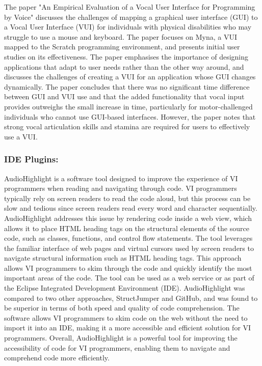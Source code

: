 \documentclass{l4proj}
\begin{document}
The paper "An Empirical Evaluation of a Vocal User Interface for Programming by Voice" \cite{Myna} discusses the challenges of mapping a graphical user interface (GUI) to a Vocal User Interface (VUI) for individuals with physical disabilities who may struggle to use a mouse and keyboard. The paper focuses on Myna, a VUI mapped to the Scratch programming environment, and presents initial user studies on its effectiveness. The paper emphasises the importance of designing applications that adapt to user needs rather than the other way around, and discusses the challenges of creating a VUI for an application whose GUI changes dynamically. The paper concludes that there was no significant time difference between GUI and VUI use and that the added functionality that vocal input provides outweighs the small increase in time, particularly for motor-challenged individuals who cannot use GUI-based interfaces. However, the paper notes that strong vocal articulation skills and stamina are required for users to effectively use a VUI.

\subsubsection{IDE Plugins:}

AudioHighlight \cite{audiohighlight_2018} is a software tool designed to improve the experience of VI programmers when reading and navigating through code. VI programmers typically rely on screen readers to read the code aloud, but this process can be slow and tedious since screen readers read every word and character sequentially. AudioHighlight addresses this issue by rendering code inside a web view, which allows it to place HTML heading tags on the structural elements of the source code, such as classes, functions, and control flow statements.
The tool leverages the familiar interface of web pages and virtual cursors used by screen readers to navigate structural information such as HTML heading tags. This approach allows VI programmers to skim through the code and quickly identify the most important areas of the code. The tool can be used as a web service or as part of the Eclipse Integrated Development Environment (IDE).
AudioHighlight was compared to two other approaches, StructJumper and GitHub, and was found to be superior in terms of both speed and quality of code comprehension. The software allows VI programmers to skim code on the web without the need to import it into an IDE, making it a more accessible and efficient solution for VI programmers. Overall, AudioHighlight is a powerful tool for improving the accessibility of code for VI programmers, enabling them to navigate and comprehend code more efficiently.
\end{document}
